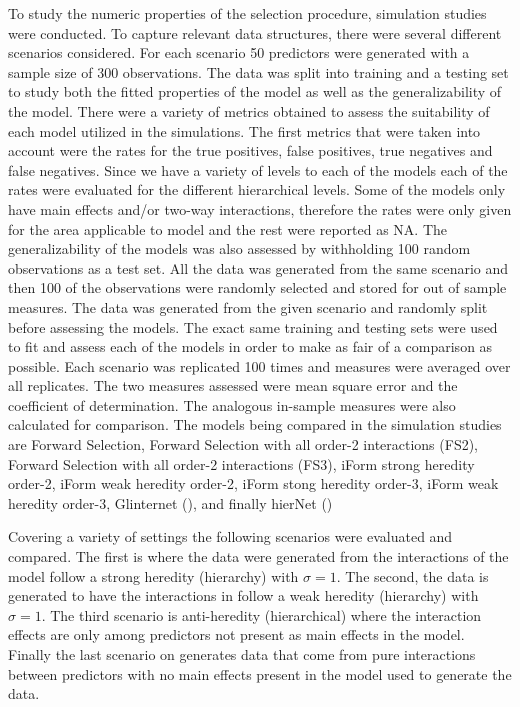 \documentclass[11pt,]{book}
\theoremstyle{definition}
\theoremstyle{definition}
\theoremstyle{remark}
\begin{document}
To study the numeric properties of the selection procedure, simulation
studies were conducted. To capture relevant data structures, there were
several different scenarios considered. For each scenario 50 predictors
were generated with a sample size of 300 observations. The data was
split into training and a testing set to study both the fitted
properties of the model as well as the generalizability of the model.
There were a variety of metrics obtained to assess the suitability of
each model utilized in the simulations. The first metrics that were
taken into account were the rates for the true positives, false
positives, true negatives and false negatives. Since we have a variety
of levels to each of the models each of the rates were evaluated for the
different hierarchical levels. Some of the models only have main effects
and/or two-way interactions, therefore the rates were only given for the
area applicable to model and the rest were reported as NA. The
generalizability of the models was also assessed by withholding 100
random observations as a test set. All the data was generated from the
same scenario and then 100 of the observations were randomly selected
and stored for out of sample measures. The data was generated from the
given scenario and randomly split before assessing the models. The exact
same training and testing sets were used to fit and assess each of the
models in order to make as fair of a comparison as possible. Each
scenario was replicated 100 times and measures were averaged over all
replicates. The two measures assessed were mean square error and the
coefficient of determination. The analogous in-sample measures were also
calculated for comparison. The models being compared in the simulation
studies are Forward Selection, Forward Selection with all order-2
interactions (FS2), Forward Selection with all order-2 interactions
(FS3), iForm strong heredity order-2, iForm weak heredity order-2, iForm
stong heredity order-3, iForm weak heredity order-3, Glinternet
(\cite{bien2013lasso}), and finally hierNet (\cite{lim2015learning})

Covering a variety of settings the following scenarios were evaluated
and compared. The first is where the data were generated from the
interactions of the model follow a strong heredity (hierarchy) with
\(\sigma = 1\). The second, the data is generated to have the
interactions in follow a weak heredity (hierarchy) with \(\sigma = 1\).
The third scenario is anti-heredity (hierarchical) where the interaction
effects are only among predictors not present as main effects in the
model. Finally the last scenario on generates data that come from pure
interactions between predictors with no main effects present in the
model used to generate the data.
\end{document}

